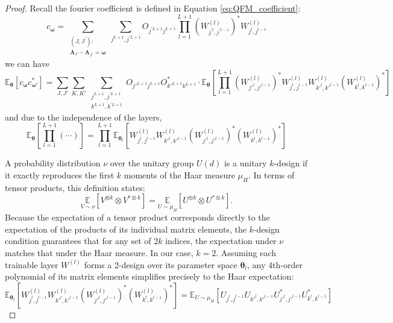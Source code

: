 \documentclass[%
 reprint,
 amsmath,amssymb,
 aps,
 pra,
]{revtex4-2}
\theoremstyle{definition}
\begin{document}
\begin{proof}
Recall the fourier coefficient is defined in Equation \eqref{eq:QFM_coefficient}:
$$
c_{\bm{\omega}}=\sum_{\substack{\left(J, J^{\prime}\right): \\ \bm{\Lambda}_J-\bm{\Lambda}_{J^{\prime}}=\bm{\omega}}} \sum_{j^{L+1}, j^{\prime L+1}} O_{j^{\prime L+1} j^{L+1}} \prod_{l=1}^{L+1}\left(W_{j^{\prime l}, j^{\prime l-1}}^{(l)}\right)^* W_{j^l, j^{l-1}}^{(l)}
$$
we can have
$$
\mathbb{E}_{\bm{\theta}} [c_{\bm{\omega}} c_{\bm{\omega}'}^*] = \sum_{J, J'} \sum_{K, K'} \sum_{\substack{j^{L+1}, j^{\prime L+1}\\
k^{L+1}, k^{\prime L+1}}} O_{j'^{L+1} j^{L+1}} O_{k'^{L+1} k^{L+1}}^* \cdot \mathbb{E}_{\bm{\theta}} \left[ \prod_{l=1}^{L+1} \left( W^{(l)}_{j'^l, j'^{l-1}} \right)^* W^{(l)}_{j^l, j^{l-1}} W^{(l)}_{k'^l, k'^{l-1}} \left( W^{(l)}_{k^l, k^{l-1}} \right)^* \right]
$$
and due to the independence of the layers,
$$
\mathbb{E}_{\bm{\theta}} \left[ \prod_{l=1}^{L+1} (\cdots) \right] = \prod_{l=1}^{L+1} \mathbb{E}_{\bm{\theta}_l} \left[ W^{(l)}_{j^l, j^{l-1}} W^{(l)}_{k'^l, k'^{l-1}} \left( W^{(l)}_{j'^l, j'^{l-1}} \right)^* \left( W^{(l)}_{k^l, k^{l-1}} \right)^* \right]
$$

A probability distribution $\nu$ over the unitary group $U(d)$ is a unitary $k$-design if it exactly reproduces the first $k$ moments of the Haar measure $\mu_H$. In terms of tensor products, this definition states:
$$
\underset{V \sim \nu}{\mathbb{E}}\left[V^{\otimes k} \otimes V^{* \otimes k}\right]=\underset{U \sim \mu_H}{\mathbb{E}}\left[U^{\otimes k} \otimes U^{* \otimes k}\right].
$$
Because the expectation of a tensor product corresponds directly to the expectation of the products of its individual matrix elements, the $k$-design condition guarantees that for any set of $2k$ indices, the expectation under $\nu$ matches that under the Haar measure. In our case, $k=2$. Assuming each trainable layer $W^{(l)}$ forms a 2-design over its parameter space $\bm{\theta}_l$, any 4th-order polynomial of its matrix elements simplifies precisely to the Haar expectation:
$$
\mathbb{E}_{\bm{\theta}_l} \left[ W^{(l)}_{j^l, j^{l-1}} W^{(l)}_{k'^l, k'^{l-1}} \left( W^{(l)}_{j'^l, j'^{l-1}} \right)^* \left( W^{(l)}_{k^l, k^{l-1}} \right)^* \right] = \mathbb{E}_{U\sim\mu_H} \left[ U_{j^l, j^{l-1}} U_{k'^l, k'^{l-1}} U_{j'^l, j'^{l-1}}^* U_{k^l, k^{l-1}}^* \right]
$$


\end{proof}
\end{document}
